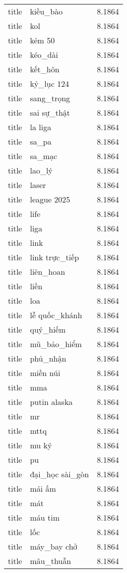 \documentclass{article}
\begin{document}
\begin{tabular}{lll}
title & kiều\_bào & 8.1864\\
title & kol & 8.1864\\
title & kém 50 & 8.1864\\
title & kéo\_dài & 8.1864\\
title & kết\_hôn & 8.1864\\
title & kỷ\_lục 124 & 8.1864\\
title & sang\_trọng & 8.1864\\
title & sai sự\_thật & 8.1864\\
title & la liga & 8.1864\\
title & sa\_pa & 8.1864\\
title & sa\_mạc & 8.1864\\
title & lao\_lý & 8.1864\\
title & laser & 8.1864\\
title & league 2025 & 8.1864\\
title & life & 8.1864\\
title & liga & 8.1864\\
title & link & 8.1864\\
title & link trực\_tiếp & 8.1864\\
title & liên\_hoan & 8.1864\\
title & liền & 8.1864\\
title & loa & 8.1864\\
title & lễ quốc\_khánh & 8.1864\\
title & quý\_hiếm & 8.1864\\
title & mũ\_bảo\_hiểm & 8.1864\\
title & phủ\_nhận & 8.1864\\
title & miền núi & 8.1864\\
title & mma & 8.1864\\
title & putin alaska & 8.1864\\
title & mr & 8.1864\\
title & mttq & 8.1864\\
title & mu ký & 8.1864\\
title & pu & 8.1864\\
title & đại\_học sài\_gòn & 8.1864\\
title & mái ấm & 8.1864\\
title & mát & 8.1864\\
title & máu tim & 8.1864\\
title & lốc & 8.1864\\
title & máy\_bay chở & 8.1864\\
title & mâu\_thuẫn & 8.1864\\

\end{tabular}
\end{document}
